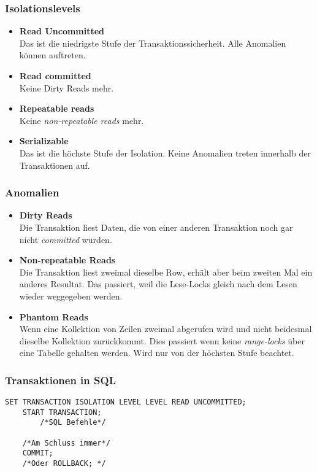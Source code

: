 \subsubsection{Isolationslevels}
\begin{itemize}
  \item \textbf{Read Uncommitted} \\
  Das ist die niedrigste Stufe der Transaktionssicherheit.  Alle Anomalien können auftreten.
  \item \textbf{Read committed} \\
  Keine Dirty Reads mehr. 
  \item \textbf{Repeatable reads} \\
  Keine \emph{non-repeatable reads} mehr. 
  \item \textbf{Serializable} \\
  Das ist die höchste Stufe der Isolation. Keine Anomalien treten innerhalb der Transaktionen auf.
\end{itemize}


\subsubsection{Anomalien}
\begin{itemize}
  \item \textbf{Dirty Reads} \\
  Die Transaktion liest Daten, die von einer anderen Transaktion noch gar nicht \emph{committed} wurden.
  \item \textbf{Non-repeatable Reads} \\
  Die Transaktion liest zweimal dieselbe Row, erhält aber beim zweiten Mal ein anderes Resultat. Das passiert, weil die Lese-Locks gleich nach dem Lesen wieder weggegeben werden.
  \item \textbf{Phantom Reads} \\
  Wenn eine Kollektion von Zeilen zweimal abgerufen wird und nicht beidesmal dieselbe Kollektion zurückkommt. Dies passiert wenn keine \emph{range-locks} über eine Tabelle gehalten werden. Wird nur von der höchsten Stufe beachtet.
  
\end{itemize}

\subsubsection{Transaktionen in SQL}
\begin{lstlisting}[caption={Transaktionen in SQL}]
    SET TRANSACTION ISOLATION LEVEL LEVEL READ UNCOMMITTED;
    START TRANSACTION;
        /*SQL Befehle*/
    
    /*Am Schluss immer*/
    COMMIT;
    /*Oder ROLLBACK; */
\end{lstlisting}
